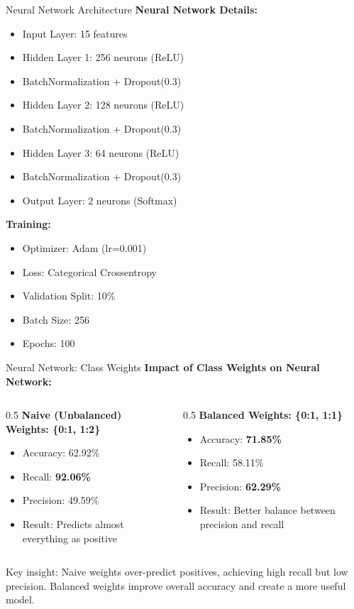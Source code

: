 \documentclass[aspectratio=169]{beamer}
\begin{document}
\begin{frame}{Neural Network Architecture}
\textbf{Neural Network Details:}
\begin{itemize}
    \item Input Layer: 15 features
    \item Hidden Layer 1: 256 neurons (ReLU)
    \item BatchNormalization + Dropout(0.3)
    \item Hidden Layer 2: 128 neurons (ReLU)
    \item BatchNormalization + Dropout(0.3)
    \item Hidden Layer 3: 64 neurons (ReLU)
    \item BatchNormalization + Dropout(0.3)
    \item Output Layer: 2 neurons (Softmax)
\end{itemize}
\textbf{Training:}
\begin{itemize}
    \item Optimizer: Adam (lr=0.001)
    \item Loss: Categorical Crossentropy
    \item Validation Split: 10\%
    \item Batch Size: 256
    \item Epochs: 100
\end{itemize}
\end{frame}

\begin{frame}{Neural Network: Class Weights}
\textbf{Impact of Class Weights on Neural Network:}

\bigskip
\begin{columns}
\begin{column}{0.5\textwidth}
\textbf{Naive (Unbalanced) Weights: \{0:1, 1:2\}}
\begin{itemize}
    \item Accuracy: 62.92\%
    \item Recall: \textbf{92.06\%}
    \item Precision: 49.59\%
    \item Result: Predicts almost everything as positive
\end{itemize}
\end{column}
\begin{column}{0.5\textwidth}
\textbf{Balanced Weights: \{0:1, 1:1\}}
\begin{itemize}
    \item Accuracy: \textbf{71.85\%}
    \item Recall: 58.11\%
    \item Precision: \textbf{62.29\%}
    \item Result: Better balance between precision and recall
\end{itemize}
\end{column}
\end{columns}

\bigskip
Key insight: Naive weights over-predict positives, achieving high recall but low precision. Balanced weights improve overall accuracy and create a more useful model.
\end{frame}
\end{document}
